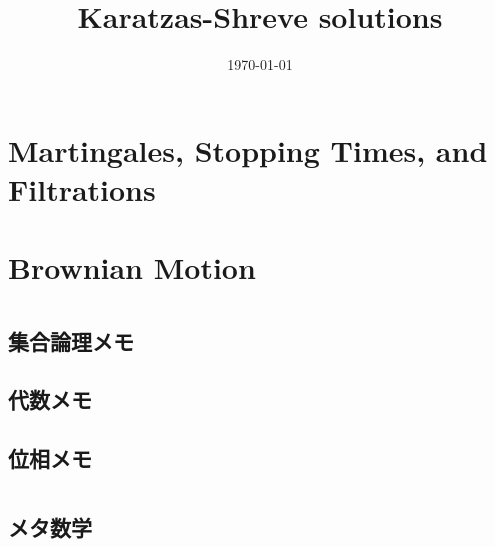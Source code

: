 \documentclass[a4j,10.5pt,oneside,openany]{jsbook}
\title{Karatzas-Shreve solutions}
\author{}
\date{\today}
\theoremstyle{mystyle}
\begin{document}
%
%
\maketitle
%
%
\tableofcontents
\frontmatter
%
\mainmatter
%
\chapter{Martingales, Stopping Times, and Filtrations}








\chapter{Brownian Motion}






\appendix
\chapter{}
\section{集合論理メモ}
	
	
	
	
	
\section{代数メモ}
	
\section{位相メモ}
	
	
	
	
	
	
	
	


	
	













\chapter{}
\section{メタ数学}

\newpage
\printindex
%
%
\end{document}
